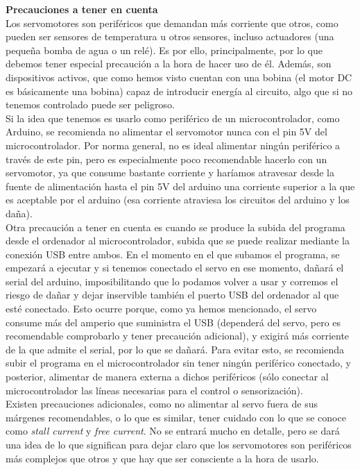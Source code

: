 \documentclass[12pt]{article}
\begin{document}
	\noindent \textbf{Precauciones a tener en cuenta} \\
	
	\noindent Los servomotores son periféricos que demandan más corriente que otros, como pueden ser sensores de temperatura u otros sensores, incluso actuadores (una pequeña bomba de agua o un relé). Es por ello, principalmente, por lo que debemos tener especial precaución a la hora de hacer uso de él. Además, son dispositivos activos, que como hemos visto cuentan con una bobina (el motor DC es básicamente una bobina) capaz de introducir energía al circuito, algo que si no tenemos controlado puede ser peligroso.\\
	
	\noindent Si la idea que tenemos es usarlo como periférico de un microcontrolador, como Arduino, se recomienda no alimentar el servomotor nunca con el pin 5V del microcontrolador. Por norma general, no es ideal alimentar ningún periférico a través de este pin, pero es especialmente poco recomendable hacerlo con un servomotor, ya que consume bastante corriente y haríamos atravesar desde la fuente de alimentación hasta el pin 5V del arduino una corriente superior a la que es aceptable por el arduino (esa corriente atraviesa los circuitos del arduino y los daña). \\
	
	\noindent Otra precaución a tener en cuenta es cuando se produce la subida del programa desde el ordenador al microcontrolador, subida que se puede realizar mediante la conexión USB entre ambos. En el momento en el que subamos el programa, se empezará a ejecutar y si tenemos conectado el servo en ese momento, dañará el serial del arduino, imposibilitando que lo podamos volver a usar y corremos el riesgo de dañar y dejar inservible también el puerto USB del ordenador al que esté conectado. Esto ocurre porque, como ya hemos mencionado, el servo consume más del amperio que suministra el USB (dependerá del servo, pero es recomendable comprobarlo y tener precaución adicional), y exigirá más corriente de la que admite el serial, por lo que se dañará. Para evitar esto, se recomienda subir el programa en el microcontrolador sin tener ningún periférico conectado, y posterior, alimentar de manera externa a dichos periféricos (sólo conectar al microcontrolador las líneas necesarias para el control o sensorización). \\
		
	\noindent Existen precauciones adicionales, como no alimentar al servo fuera de sus márgenes recomendables, o lo que es similar, tener cuidado con lo que se conoce como \textit{stall current} y \textit{free current}. No se entrará mucho en detalle, pero se dará una idea de lo que significan para dejar claro que los servomotores son periféricos más complejos que otros y que hay que ser consciente a la hora de usarlo.
\end{document}
